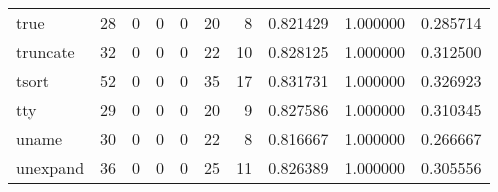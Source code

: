 \begin{longtable}{lrrrrrrrrr}
true      &                                        28 &                                                  0 &                                                  0 &                                                  0 &                                                 20 &                                                  8 &                                           0.821429 &                               1.000000 &                             0.285714 \\
truncate  &                                        32 &                                                  0 &                                                  0 &                                                  0 &                                                 22 &                                                 10 &                                           0.828125 &                               1.000000 &                             0.312500 \\
tsort     &                                        52 &                                                  0 &                                                  0 &                                                  0 &                                                 35 &                                                 17 &                                           0.831731 &                               1.000000 &                             0.326923 \\
tty       &                                        29 &                                                  0 &                                                  0 &                                                  0 &                                                 20 &                                                  9 &                                           0.827586 &                               1.000000 &                             0.310345 \\
uname     &                                        30 &                                                  0 &                                                  0 &                                                  0 &                                                 22 &                                                  8 &                                           0.816667 &                               1.000000 &                             0.266667 \\
unexpand  &                                        36 &                                                  0 &                                                  0 &                                                  0 &                                                 25 &                                                 11 &                                           0.826389 &                               1.000000 &                             0.305556 \\

\end{longtable}
